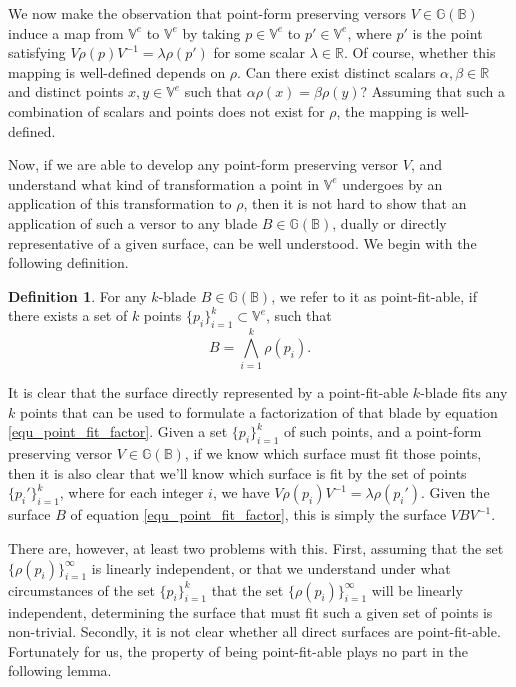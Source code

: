 \documentclass{birkjour}
\theoremstyle{definition}
\newtheorem{defn}[thm]{Definition}
\theoremstyle{remark}
\numberwithin{equation}{section}
\newcommand{\G}{\mathbb{G}}
\newcommand{\V}{\mathbb{V}}
\newcommand{\R}{\mathbb{R}}
\newcommand{\B}{\mathbb{B}}
\begin{document}
We now make the observation that point-form
preserving versors $V\in\G(\B)$ induce a map from $\V^e$ to $\V^e$ by
taking $p\in\V^e$ to $p'\in\V^e$, where $p'$ is the point satisfying
$V\rho(p)V^{-1}=\lambda\rho(p')$ for some scalar $\lambda\in\R$.
Of course, whether this mapping is well-defined depends on $\rho$.
Can there exist distinct scalars $\alpha,\beta\in\R$ and distinct
points $x,y\in\V^e$ such that $\alpha\rho(x)=\beta\rho(y)$?
Assuming that such a combination of scalars and points does not exist for $\rho$,
the mapping is well-defined.

Now, if we are able to develop any point-form preserving versor $V$,
and understand what kind of transformation a point in $\V^e$ undergoes by an application
of this transformation to $\rho$, then it is not hard to show that an application of
such a versor to any blade $B\in\G(\B)$, dually or directly representative of a given surface,
can be well understood.
We begin with the following definition.
\begin{defn}
For any $k$-blade $B\in\G(\B)$, we refer to it as point-fit-able, if there
exists a set of $k$ points $\{p_i\}_{i=1}^k\subset\V^e$, such that
\begin{equation}\label{equ_point_fit_factor}
B = \bigwedge_{i=1}^k\rho(p_i).
\end{equation}
\end{defn}
It is clear that the surface directly represented by a point-fit-able $k$-blade fits
any $k$ points that can be used to formulate a factorization of that blade
by equation \eqref{equ_point_fit_factor}.  Given a set $\{p_i\}_{i=1}^k$ of such points,
and a point-form preserving versor $V\in\G(\B)$,
if we know which surface must fit those points, then it is also clear that
we'll know which surface is fit by the set of points $\{p_i'\}_{i=1}^k$,
where for each integer $i$, we have $V\rho(p_i)V^{-1}=\lambda\rho(p_i')$.
Given the surface $B$ of equation \eqref{equ_point_fit_factor}, this is simply the surface $VBV^{-1}$.

There are, however, at least two problems with this.  First, assuming that
the set $\{\rho(p_i)\}_{i=1}^\infty$ is linearly independent, or that
we understand under what circumstances of the set $\{p_i\}_{i=1}^k$
that the set $\{\rho(p_i)\}_{i=1}^\infty$ will be linearly independent, determining the
surface that must fit such a given set of points is non-trivial.
Secondly, it is not clear whether all direct surfaces are point-fit-able.
Fortunately for us, the property of being point-fit-able plays no
part in the following lemma.
\end{document}
